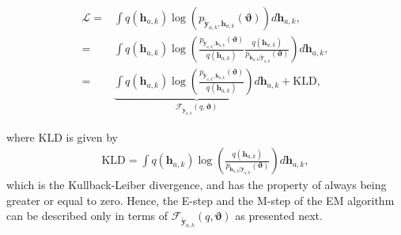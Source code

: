 \documentclass[conference,twocolumn,a4paper]{IEEEtran}
\theoremstyle{remark} \newtheorem{remark}{Remark}
\begin{document}
\begin{align}
	\mathcal{L}  \!=\!&\int q(\mathbf{h}_{a,k}) \log \left(p_{\tilde{\mathbf{y}}_{a,k},\mathbf{h}_{a,k}}\left(\mathbf{\vartheta}\right)\right) d \mathbf{h}_{a,k}, \nonumber\\
	 \!=\!&\int q(\mathbf{h}_{a,k}) \log\left( \frac{p_{\tilde{\mathbf{y}}_{a,k},\mathbf{h}_{a,k}}\left(\mathbf{\vartheta}\right)}{q(\mathbf{h}_{a,k})}\frac{q(\mathbf{h}_{a,k})}{p_{\mathbf{h}_{a,k}|\tilde{\mathbf{y}}_{a,k}}\left(\mathbf{\vartheta}\right)}\right) d \mathbf{h}_{a,k}, \nonumber\\
	\!=\!&\underbrace{\int q(\mathbf{h}_{a,k}) \log \left(\frac{p_{\tilde{\mathbf{y}}_{a,k},\mathbf{h}_{a,k}}\left(\mathbf{\vartheta}\right)}{q(\mathbf{h}_{a,k})}\right)d \mathbf{h}_{a,k}}_{\mathcal{F}_{\tilde{\mathbf{y}}_{a,k}}\!\left(q, \mathbf{\vartheta}\right)}+\mathrm{KLD},
\end{align}


where $\mathrm{KLD}$ is given by
\begin{align}
	\mathrm{KLD}\!
 =\!\!\!\int\!\! q(\mathbf{h}_{a,k})\! \log\!\left(\! \frac{q(\mathbf{h}_{a,k})}{p_{\mathbf{h}_{a,k}|\tilde{\mathbf{y}}_{a,k}}\left(\mathbf{\vartheta}\right)}\!\right)\!d \mathbf{h}_{a,k},
\end{align}
which is the Kullback-Leiber divergence, and has the property of always being greater or equal to zero. Hence, the E-step and the M-step of the EM algorithm can be described only in terms of $\mathcal{F}_{\tilde{\mathbf{y}}_{a,k}}\!\left(q, \mathbf{\vartheta}\right)$ as presented next.
\end{document}
